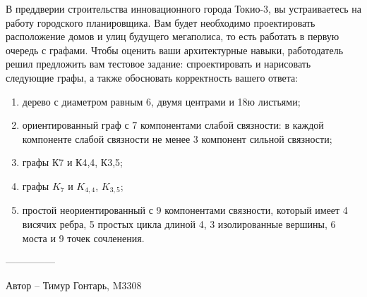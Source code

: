 \question
В преддверии строительства инновационного города Токио-3, вы устраиваетесь на работу городского планировщика. Вам будет необходимо проектировать расположение домов и улиц будущего мегаполиса, то есть работать в первую очередь с графами. Чтобы оценить ваши архитектурные навыки, работодатель решил предложить вам тестовое задание: спроектировать и нарисовать следующие графы, а также обосновать корректность вашего ответа:

\begin{enumerate}
\item  дерево с диаметром равным 6, двумя центрами  и  18ю листьями;
\item  ориентированный граф с 7 компонентами слабой связности: в  каждой компоненте слабой связности не менее 3 компонент сильной связности;
\item  графы К7 и К4,4, К3,5;
\item  графы $K_7$ и $K_{4,4}$, $K_{3,5}$;
\item  простой неориентированный с 9 компонентами связности, который имеет 4 висячих ребра, 5 простых цикла длиной 4, 3 изолированные вершины, 6 моста и 9 точек сочленения.
\end{enumerate}

---------------

Автор -- Тимур Гонтарь, M3308
